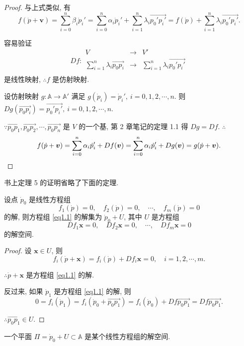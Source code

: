 \documentclass[color=black,device=normal,lang=cn,mode=geye]{elegantnote}
\begin{document}
\begin{proof}
    与上式类似, 有
    \[f(\dot{p}+\boldsymbol{v})=\sum\limits_{i=0}^n\beta_i\dot{p}_i'=\sum\limits_{i=0}^n\alpha_i\dot{p}_i'+\sum\limits_{i=1}^n\lambda_i\overrightarrow{p_0'p_i'}=f(\dot{p})+\sum\limits_{i=1}^n\lambda_i\overrightarrow{p_0'p_i'}.\]

    容易验证
    \[Df:\begin{array}{rcl}
        V & \to & V' \\
        \sum\limits_{i=1}^n\lambda_i\overrightarrow{p_0p_i} & \to & \sum\limits_{i=1}^n\lambda_i\overrightarrow{p_0'p_i'} \\
    \end{array}\]
    是线性映射, $\therefore f$ 是仿射映射.

    设仿射映射 $g:\mathbb{A}\to\mathbb{A}'$ 满足 $g(\dot{p}_i)=\dot{p}_i',\ i=0,1,2,\cdots,n$. 则 $Dg(\overrightarrow{p_0p_i})=\overrightarrow{p_0'p_i'},\ i=0,1,2,\cdots,n$.

    $\because\overrightarrow{p_0p_1},\overrightarrow{p_0p_2},\cdots,\overrightarrow{p_0p_n}$ 是 $V$ 的一个基, 第 2 章笔记的定理 1.1 得 $Dg=Df$. $\therefore$
    \[f(\dot{p}+\boldsymbol{v})=\sum\limits_{i=0}^n\alpha_i\dot{p}_i'+Df(\boldsymbol{v})=\sum\limits_{i=0}^n\alpha_i\dot{p}_i'+Dg(\boldsymbol{v})=g(\dot{p}+\boldsymbol{v}).\qedhere\]
\end{proof}
书上定理 5 的证明省略了下面的定理.
\begin{theorem}
    设点 $\dot{p}_0$ 是线性方程组
    \begin{equation}\label{eq1.1}
        f_1(\dot{p})=0,\quad f_2(\dot{p})=0,\quad \cdots,\quad f_m(\dot{p})=0
    \end{equation}
    的解, 则方程组 \ref{eq1.1} 的解集为 $\dot{p}_0+U$, 其中 $U$ 是方程组
    \[Df_1\boldsymbol{x}=0,\quad Df_2\boldsymbol{x}=0,\quad \cdots,\quad Df_m\boldsymbol{x}=0\]
    的解空间.
\end{theorem}
\begin{proof}
    设 $\boldsymbol{x}\in U$, 则
    \[f_i(\dot{p}+\boldsymbol{x})=f_i(\dot{p})+Df_i\boldsymbol{x}=0,\quad i=1,2,\cdots,m.\]

    $\therefore\dot{p}+\boldsymbol{x}$ 是方程组 \ref{eq1.1} 的解.

    反过来, 如果 $\dot{p}_1$ 是方程组 \ref{eq1.1} 的解, 则
    \[0=f_i(\dot{p}_1)=f_i(\dot{p}_0+\overrightarrow{p_0p_1})=f_i(\dot{p}_0)+Df\overrightarrow{p_0p_1}=Df\overrightarrow{p_0p_1}.\]

    $\therefore\overrightarrow{p_0p_1}\in U$.
\end{proof}
\begin{theorem}
    一个平面 $\varPi=\dot{p}_0+U\subset\mathbb{A}$ 是某个线性方程组的解空间.
\end{theorem}
\end{document}
